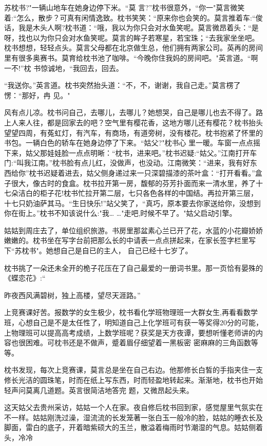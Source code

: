 \documentclass{article}
\begin{document}
苏枕书?"一辆山地车在她身边停下米。“莫
\newpage
言?”枕书很意外，“你一"莫言微笑着:“怎么，散步？可真有闲情逸致。枕书笑笑：“原来你也会笑的。莫言推着车:“俊话，我是木头人啊?枕书道：“哦，我以为你只会对水鱼笑呢。莫言微昂着头：“是呀，找也以为你只会对水鱼笑呢。莫言的眸子若寒星，若宝珠；“去我家坐坐吧。枕书想想，轻轻点头。莫言父母都在北京做生总，他们拥有两家公司。英再的房间里有很多奥赛书。莫育给枕书池了咖啡。“今晚你住我妈的房间吧。"英言道。“啊一不!”枕
书惊诚地，“我回去，回去。 

“我送你。”英言道。枕书突然抬头道：“不，不，谢谢，我自己走。”莫言楞了愣：“那好，冉
见。" 

风有点儿凉。枕书问自己，去哪儿，去哪儿？她想哭，自己是哪儿也去不得了。路上人来人往，都是回家去的吧？空气里有樱花香，这地方哪儿还有樱花？枕书抬头望望四周，有菟虹灯，有汽车，有商场，有道旁树，没有楼花。枕书抱紧了怀里的书包。一辆白色的轿车在她身边停了下来。“姑父?"枕书心
\newpage
里一暖。车窗一点点摇下来，姑父那娃娃脸一点点明晰：“枕书，进来吧。”枕书迟疑:“姑父。”江南打开车门:“叫我江南。”枕书脸有点儿红，没做声，也没动。江南微笑：“进来，我有好东西给你”枕书迟疑着进去，姑父侧身递过来一只深碧描漆的茶叶盒：“打开看看。”盒子很大，像古时的食盒。枕书拉开第一房，馥郁的芬芳扑面而来一清水里，养了十七朵洁白的柜子花!枕书忙拉开第二层，七只各色各样的中国结。再拉开第三层，十七只奶油萨其马。“生日快乐!”站父笑了，“真巧，原本要去你家送给你，没想到你在街上。”枕书不知该说什么:"我…
…"走吧,时候不早了。"姑父启动引擎。 

姑姑到周庄去了，单位组织旅游。书房里那盆素心兰已开了花，水蓝的小花瓣娇娇嫩嫩的。枕书坐在写字台前把那么长的中请表一点点拼起来，在家长签字栏里写下“苏枕书"。她想自己是自已的主人，
自己已经十七岁了。 

枕书挑了一朵还未全开的桅子花压在了自己最爱的一册词书里。那一页恰有晏殊的《蝶恋花》:“
\newpage

昨夜西风满碧树，独上高楼，望尽天涯路。” 

上竞赛课好苦。报数学的女生极少，枕书看化学班物理班一大群女生,再看看数学班，心想自己是不是太任性了，明知道自己上化学班可有获一等奖得20分的可能，上物理班可以提高高考成绩，上数学班呢？获奖是天方夜谭，要想听懂老师讲的内容也很困难。可枕书还是不做声，蹙着眉仔细望着一黑板密
密麻麻的三角函数等等。 

枕书发现，每次上竞赛课，莫言总是坐在自己右边。他那修长白皙的手指夹住一支修长光洁的圆珠笔，时而在纸上写东西，时而轻盈地转起来。渐渐地，枕书也开始轻声问莫离几道题。英言很简洁地答完
题，又微昂起头来。 

这天姑父去贵州采访，姑姑一个人在家。夜自修后枕书回到家，感觉屋里气氛实在不一样。姑姑刚洗过澡，湿流流的长发笼著一张白玉一般冷的脸，姑姑的睡衣长及脚面，雷白的底子，开着暗紫硕大的玉兰，散溢着梅雨时节潮湿的气息。姑姑侧着头，冷冷
\newpage
\end{document}
